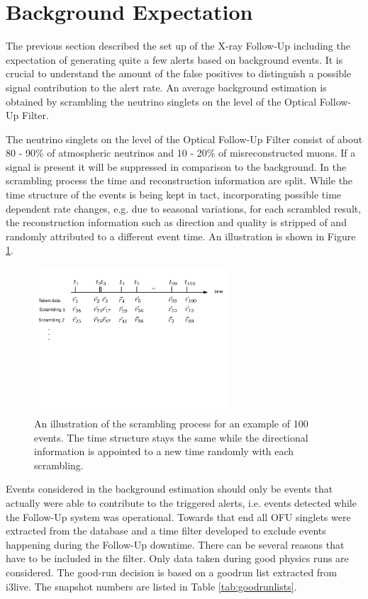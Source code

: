 \section{Background Expectation}
The previous section described the set up of the X-ray Follow-Up including the 
expectation of generating quite a few alerts based on background events. It is 
crucial to understand the amount of the false positives to distinguish a 
possible signal contribution to the alert rate. An average background 
estimation is obtained by scrambling the neutrino singlets on the level of the 
Optical Follow-Up Filter.

The neutrino singlets on the level of the Optical Follow-Up Filter consist of 
about 80 - 90\% 
of atmospheric neutrinos and 10 - 20\% of 
misreconstructed muons. If a signal is present it will be suppressed  in 
comparison to the background. 
In the scrambling process the time and reconstruction information are split. 
While the time structure of the events is being kept in tact, incorporating 
possible time dependent rate changes, e.g. due to seasonal variations, for each 
scrambled result, the reconstruction information such as direction and quality 
is stripped of and randomly attributed to a different event time. An 
illustration is shown in Figure \ref{fig:scrambling_illustration}.
\begin{figure}[h]
 \centering
\includegraphics[trim=0cm 10.5cm 1cm 
1cm,clip=true,width=0.65\textwidth]{fig/scrambling_illustration.pdf}
\caption{An illustration of the scrambling process for an example of 100 
events. The time structure stays the same while the directional information is 
appointed to a new time randomly with each scrambling.}
\label{fig:scrambling_illustration}
\end{figure}

Events considered in the background estimation should only be events that 
actually were able to contribute to the triggered alerts, i.e. events detected 
while the Follow-Up system was operational. Towards that end all OFU singlets 
were extracted from the database and a time filter 
developed to exclude events happening during the Follow-Up downtime.
There can be several reasons that have to be included in the filter. Only data 
taken during good physics runs are considered. The good-run decision is based 
on a goodrun list extracted from i3live. The snapshot numbers are listed in 
 Table \ref{tab:goodrunlists}.

